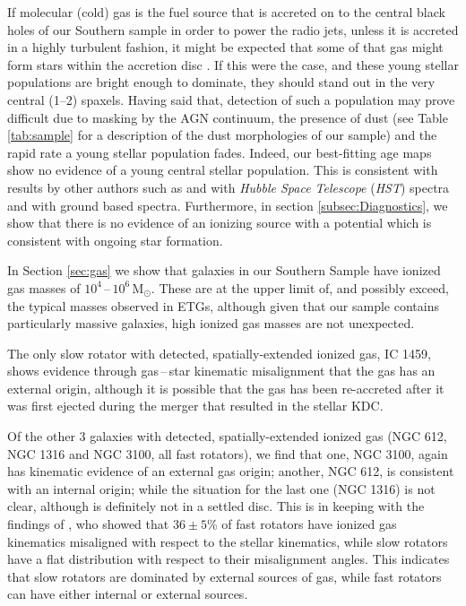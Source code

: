\documentclass[a4paper,fleqn,usenatbib]{mnras}
\begin{document}
	If molecular (cold) gas is the fuel source that is accreted on to the central black holes of our Southern sample in order to power the radio jets, unless it is accreted in a highly turbulent fashion, it might be expected that some of that gas might form stars within the accretion disc \citep[e.g.][]{Collin1999, Diamond-Stanic2012, LaMassa2013}. If this were the case, and these young stellar populations are bright enough to dominate, they should stand out in the very central (1--2) spaxels. Having said that, detection of such a population may prove difficult due to masking by the AGN continuum, the presence of dust (see Table \ref{tab:sample} for a description of the dust morphologies of our sample) and the rapid rate a young stellar population fades. Indeed, our best-fitting age maps show no evidence of a young central stellar population. This is consistent with results by other authors such as \citet{GonzalezDelgado2004} and \citet{Sarzi2005b} with \textit{Hubble Space Telescope} (\textit{HST}) spectra and \citet{CidFernandes2004} with ground based spectra. Furthermore, in section \ref{subsec:Diagnostics}, we show that there is no evidence of an ionizing source with a potential which is consistent with ongoing star formation. 

	In Section \ref{sec:gas} we show that galaxies in our Southern Sample have ionized gas masses of $10^4$\,--\,$10^6\,\mathrm{M_\odot}$. These are at the upper limit of, and possibly exceed, the typical masses observed in ETGs, although given that our sample contains particularly massive galaxies, high ionized gas masses are not unexpected. 

	The only slow rotator with detected, spatially-extended ionized gas, IC 1459, shows evidence through gas\,--\,star kinematic misalignment that the gas has an external origin, although it is possible that the gas has been re-accreted after it was first ejected during the merger that resulted in the stellar KDC. 

	Of the other 3 galaxies with detected, spatially-extended ionized gas (NGC 612, NGC 1316 and NGC 3100, all fast rotators), we find that one, NGC 3100, again has kinematic evidence of an external gas origin; another, NGC 612, is consistent with an internal origin; while the situation for the last one (NGC 1316) is not clear, although is definitely not in a settled disc. This is in keeping with the findings of \citet{Davis2011a}, who showed that $36\pm5$\% of fast rotators have ionized gas kinematics misaligned with respect to the stellar kinematics, while slow rotators have a flat distribution with respect to their misalignment angles. This indicates that slow rotators are dominated by external sources of gas, while fast rotators can have either internal or external sources. 
\end{document}
